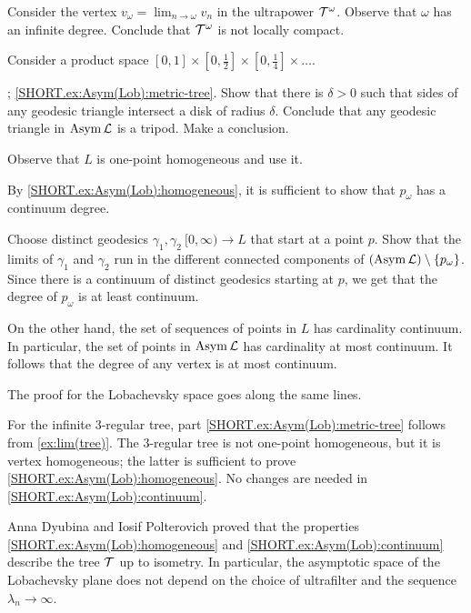 Consider the vertex $v_\omega=\lim_{n\to\omega}v_n$ in the ultrapower $\mathcal{T}^\omega$.
Observe that $\omega$ has an infinite degree.
Conclude that $\mathcal{T}^\omega$ is not locally compact.

 Consider a product space $[0,1]\times[0,\tfrac12]\times[0,\tfrac14]\times\dots$.

\parbf{\ref{ex:Asym(Lob)}}; \ref{SHORT.ex:Asym(Lob):metric-tree}.
Show that there is $\delta>0$ such that sides of any geodesic triangle intersect a disk of radius $\delta$.
Conclude that any geodesic triangle in $\mathop{\rm Asym}\nolimits\mathcal{L}$ is a tripod.
Make a conclusion.

 Observe that $L$ is one-point homogeneous and use it.

By \ref{SHORT.ex:Asym(Lob):homogeneous}, it is sufficient to show that $p_\omega$ has a continuum degree.

Choose distinct geodesics $\gamma_1,\gamma_2\:[0,\infty)\to L$ that start at a point $p$.
Show that the limits of $\gamma_1$ and $\gamma_2$ run in the different connected components of $(\mathop{\rm Asym}\nolimits\mathcal{L})\setminus \{p_\omega\}$.
Since there is a continuum of distinct geodesics starting at $p$,
we get that the degree of $p_\omega$ is at least continuum.

On the other hand, the set of sequences of points in $L$  has cardinality continuum.
In particular, the set of points in $\mathop{\rm Asym}\nolimits\mathcal{L}$ has cardinality at most continuum.
It follows that the degree of any vertex is at most continuum.

The proof for the Lobachevsky space goes along the same lines.

For the infinite 3-regular tree, part \ref{SHORT.ex:Asym(Lob):metric-tree} follows from \ref{ex:lim(tree)}.
The 3-regular tree is not one-point homogeneous, but it is vertex homogeneous; the latter is sufficient to prove \ref{SHORT.ex:Asym(Lob):homogeneous}.
No changes are needed in \ref{SHORT.ex:Asym(Lob):continuum}.

Anna Dyubina and Iosif Polterovich \cite{dyubina-polterovich} proved that the properties \ref{SHORT.ex:Asym(Lob):homogeneous} and \ref{SHORT.ex:Asym(Lob):continuum} describe the tree $\mathcal{T}$ up to isometry.
In particular, the asymptotic space of the Lobachevsky plane does not depend on the choice of ultrafilter and the sequence $\lambda_n\to \infty$.
